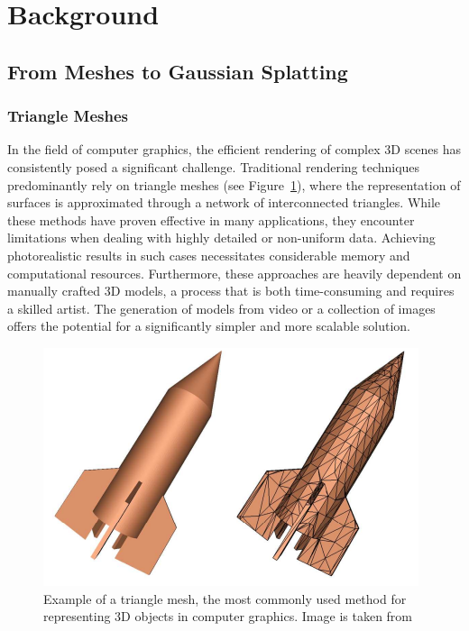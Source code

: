 \documentclass[12pt]{article}
\begin{document}
\section{Background}
\subsection{From Meshes to Gaussian Splatting}
\subsubsection{Triangle Meshes}
In the field of computer graphics, the efficient rendering of complex 3D scenes has consistently posed a significant challenge. Traditional rendering techniques predominantly rely on triangle meshes (see Figure~\ref{fig:trianglemesh}), where the representation of surfaces is approximated through a network of interconnected triangles. While these methods have proven effective in many applications, they encounter limitations when dealing with highly detailed or non-uniform data. Achieving photorealistic results in such cases necessitates considerable memory and computational resources. Furthermore, these approaches are heavily dependent on manually crafted 3D models, a process that is both time-consuming and requires a skilled artist. The generation of models from video or a collection of images offers the potential for a significantly simpler and more scalable solution.
\begin{figure}[h!]
	\centering
	\includegraphics[width=\textwidth]{Images/TriangleMesh.png}
	\caption{Example of a triangle mesh, the most commonly used method for representing 3D objects in computer graphics. Image is taken from \cite{Mesh}}
	\label{fig:trianglemesh}
\end{figure}
\newpage
\end{document}
